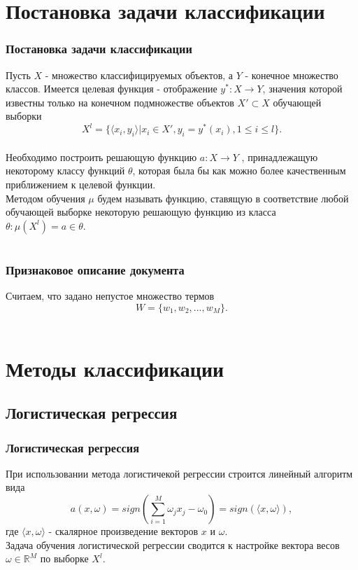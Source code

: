 \documentclass{beamer}
\begin{document}
\section{Постановка задачи классификации}
\begin{frame}
\frametitle{Постановка задачи классификации}
Пусть $X$ - множество классифицируемых объектов, а $Y$ - конечное множество классов. Имеется целевая функция - отображение $y^*:X\rightarrow Y$, значения которой известны только на конечном подмножестве объектов $X' \subset X$ обучающей выборки \\
$$X^l=\{\langle x_i,y_i \rangle |x_i \in X', y_i=y^*(x_i),1\le i \le l\}.$$
\\Необходимо построить решающую функцию $a: X \rightarrow Y$ , принадлежащую
некоторому классу функций $\theta$, которая была бы как можно более качественным
приближением к целевой функции. 
\\Методом обучения $\mu$ будем называть функцию, ставящую в соответствие любой обучающей выборке некоторую
решающую функцию из класса $\theta: \mu(X^l)=a \in \theta.$
\end{frame}

\section{}
\begin{frame}
\frametitle{Признаковое описание документа}
Считаем, что задано непустое множество термов $$W=\{w_1,w_2,...,w_M\}.$$\\

\end{frame}

\section{Методы классификации}
\subsection{Логистическая регрессия}
\begin{frame}
\frametitle{Логистическая регрессия}
При использовании метода логистичекой регрессии строится линейный алгоритм вида
$$a(x,\omega)=sign\left(\sum\limits_{i=1}^M\omega_j x_j-\omega_0\right)=sign\left(\langle x,\omega \rangle\right),$$ где $\langle x,\omega \rangle$ - скалярное произведение векторов $x$ и $\omega$.
\newline
\\Задача обучения логистической регрессии сводится к настройке вектора весов $\omega\in \mathbb{R}^M$ по выборке $X^l$.
\end{frame}
\end{document}
